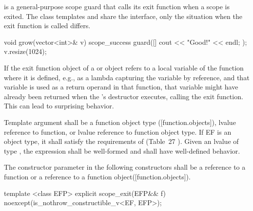 \documentclass[ebook,11pt,article]{memoir}
\begin{document}
\pnum
{} is a general-purpose scope guard that calls its exit function when a scope is exited. The class templates  and  share the  interface, only the situation when the exit function is called differs.\\
\begin{example}
\begin{codeblock}
void grow(vector<int>& v){
	scope_success guard([]{ cout << "Good!" << endl; });
	v.resize(1024);
}
\end{codeblock}
\end{example}

\pnum
\begin{note}
If the exit function object of a  or  object refers to a local variable of the function where it is defined, e.g., as a lambda capturing the variable by reference, and that variable is used as a return operand in that function, that variable might have already been returned when the 's destructor executes, calling the exit function. This can lead to surprising behavior. 
\end{note}


\pnum
\requires
Template argument  shall be a function object type ([function.objects]), 
lvalue reference to function, or 
lvalue reference to function object type.
If EF is an object type, it  shall satisfy
the requirements of  (Table~27
). 
Given an lvalue  of type , the expression  shall be well-formed and shall have well-defined behavior.

\pnum
The constructor parameter  in the following constructors shall be a reference to a function or a reference to a function object([function.objects]). 


\begin{itemdecl}
template <class EFP>
explicit
scope_exit(EFP&& f) noexcept(is_nothrow_constructible_v<EF, EFP>);
\end{itemdecl}
\end{document}
